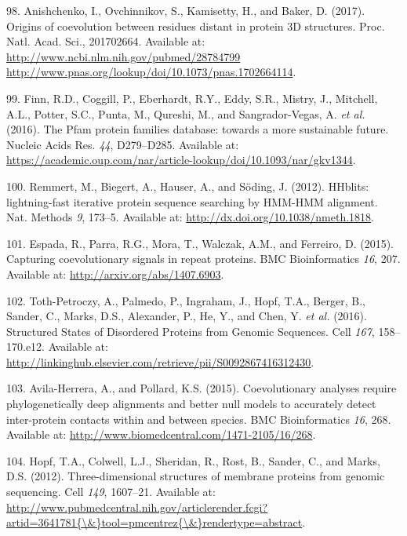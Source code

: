 \documentclass[12pt,a4paper,twoside]{book}
\theoremstyle{definition}
\theoremstyle{definition}
\theoremstyle{remark}
\begin{document}
\hypertarget{ref-Anishchenko2017}{}
98. Anishchenko, I., Ovchinnikov, S., Kamisetty, H., and Baker, D.
(2017). Origins of coevolution between residues distant in protein 3D
structures. Proc. Natl. Acad. Sci., 201702664. Available at:
\href{http://www.ncbi.nlm.nih.gov/pubmed/28784799\%20http://www.pnas.org/lookup/doi/10.1073/pnas.1702664114}{http://www.ncbi.nlm.nih.gov/pubmed/28784799 http://www.pnas.org/lookup/doi/10.1073/pnas.1702664114}.

\hypertarget{ref-Finn2016}{}
99. Finn, R.D., Coggill, P., Eberhardt, R.Y., Eddy, S.R., Mistry, J.,
Mitchell, A.L., Potter, S.C., Punta, M., Qureshi, M., and
Sangrador-Vegas, A. \emph{et al.} (2016). The Pfam protein families
database: towards a more sustainable future. Nucleic Acids Res.
\emph{44}, D279--D285. Available at:
\url{https://academic.oup.com/nar/article-lookup/doi/10.1093/nar/gkv1344}.

\hypertarget{ref-Remmert2012}{}
100. Remmert, M., Biegert, A., Hauser, A., and Söding, J. (2012).
HHblits: lightning-fast iterative protein sequence searching by HMM-HMM
alignment. Nat. Methods \emph{9}, 173--5. Available at:
\url{http://dx.doi.org/10.1038/nmeth.1818}.

\hypertarget{ref-Espada2014}{}
101. Espada, R., Parra, R.G., Mora, T., Walczak, A.M., and Ferreiro, D.
(2015). Capturing coevolutionary signals in repeat proteins. BMC
Bioinformatics \emph{16}, 207. Available at:
\url{http://arxiv.org/abs/1407.6903}.

\hypertarget{ref-Toth-Petroczy2016}{}
102. Toth-Petroczy, A., Palmedo, P., Ingraham, J., Hopf, T.A., Berger,
B., Sander, C., Marks, D.S., Alexander, P., He, Y., and Chen, Y.
\emph{et al.} (2016). Structured States of Disordered Proteins from
Genomic Sequences. Cell \emph{167}, 158--170.e12. Available at:
\url{http://linkinghub.elsevier.com/retrieve/pii/S0092867416312430}.

\hypertarget{ref-Avila-Herrera2015a}{}
103. Avila-Herrera, A., and Pollard, K.S. (2015). Coevolutionary
analyses require phylogenetically deep alignments and better null models
to accurately detect inter-protein contacts within and between species.
BMC Bioinformatics \emph{16}, 268. Available at:
\url{http://www.biomedcentral.com/1471-2105/16/268}.

\hypertarget{ref-Hopf2012}{}
104. Hopf, T.A., Colwell, L.J., Sheridan, R., Rost, B., Sander, C., and
Marks, D.S. (2012). Three-dimensional structures of membrane proteins
from genomic sequencing. Cell \emph{149}, 1607--21. Available at:
\href{http://www.pubmedcentral.nih.gov/articlerender.fcgi?artid=3641781\%7B/\&\%7Dtool=pmcentrez\%7B/\&\%7Drendertype=abstract}{http://www.pubmedcentral.nih.gov/articlerender.fcgi?artid=3641781\{\textbackslash{}\&\}tool=pmcentrez\{\textbackslash{}\&\}rendertype=abstract}.
\end{document}
